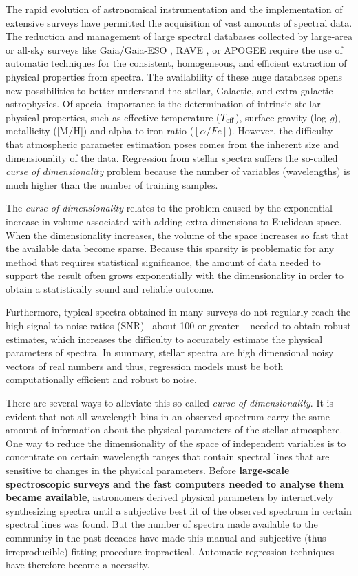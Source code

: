 \documentclass[a4paper,fleqn,usenatbib]{mnras}
\begin{document}
The rapid evolution of astronomical instrumentation and the
implementation of extensive surveys have permitted the acquisition of
vast amounts of spectral data.  The reduction and management of large
spectral databases collected by large-area or all-sky surveys like
Gaia/Gaia-ESO \citep{2006MNRAS.367..290J,2012Msngr.147...25G}, RAVE
\citep{2006AJ....132.1645S}, or APOGEE \citep{2011AJ....142...72E}
require the use of automatic techniques for the consistent,
homogeneous, and efficient extraction of physical properties from
spectra. The availability of these huge databases opens new
possibilities to better understand the stellar, Galactic, and
extra-galactic astrophysics. Of special importance is the
determination of intrinsic stellar physical properties, such as
effective temperature ($T_{\rm eff}$), surface gravity (log
\textit{g}), metallicity ([M/H]) and alpha to iron ratio 
($\left[ \alpha/Fe \right]$). However, the difficulty that
atmospheric parameter estimation poses comes from the inherent size
and dimensionality of the data.  Regression from stellar spectra
suffers the so-called {\sl curse of dimensionality} problem because
the number of variables (wavelengths) is much higher than the number
of training samples. 
    
The \textit{curse of dimensionality} \citep{bellman:61} relates to 
the problem caused by the exponential increase in volume associated 
with adding extra dimensions to Euclidean space. 
When the dimensionality increases, the volume of the space increases so 
fast that the available data become sparse. Because this sparsity is 
problematic for any method that requires statistical significance, the 
amount of data needed to support the result often grows exponentially 
with the dimensionality in order to obtain a statistically sound and 
reliable outcome.

Furthermore, typical spectra obtained in many surveys do not 
regularly reach the high signal-to-noise ratios (SNR) --about
100 or greater -- needed to obtain robust estimates, which
increases the difficulty to accurately estimate the physical
parameters of spectra.  In summary, stellar spectra are high
dimensional noisy vectors of real numbers and thus,
regression models must be both computationally efficient and robust
to noise.

There are several ways to alleviate this so-called \textit{curse of
  dimensionality}. It is evident that not all wavelength bins in an
observed spectrum carry the same amount of information about the
physical parameters of the stellar atmosphere. One way to reduce the
dimensionality of the space of independent variables is to concentrate
on certain wavelength ranges that contain spectral lines that are
sensitive to changes in the physical parameters. Before {\bf large-scale 
	spectroscopic surveys and the fast computers needed to analyse them 
	became available}, astronomers derived
physical parameters by interactively synthesizing spectra until a
subjective best fit of the observed spectrum in certain spectral lines
was found. But the number of spectra made available to the community
in the past decades have made this manual and subjective (thus
irreproducible) fitting procedure impractical. Automatic regression
techniques have therefore become a necessity.
\end{document}
